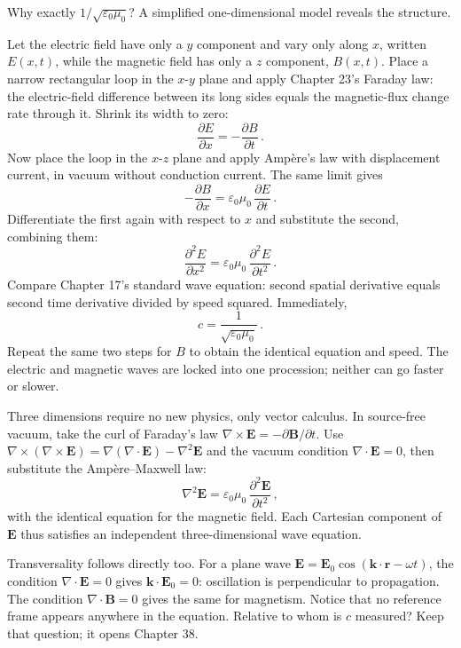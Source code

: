 \begin{mathbridge}
Why exactly $1/\sqrt{\varepsilon_0\mu_0}$? A simplified one-dimensional model reveals the structure.

Let the electric field have only a $y$ component and vary only along $x$, written $E(x,t)$, while the magnetic field has only a $z$ component, $B(x,t)$. Place a narrow rectangular loop in the $x$-$y$ plane and apply Chapter 23's Faraday law: the electric-field difference between its long sides equals the magnetic-flux change rate through it. Shrink its width to zero:
\[
  \frac{\partial E}{\partial x}=-\frac{\partial B}{\partial t}\,.
\]
Now place the loop in the $x$-$z$ plane and apply Ampère's law with displacement current, in vacuum without conduction current. The same limit gives
\[
  -\frac{\partial B}{\partial x}=\varepsilon_0\mu_0\,\frac{\partial E}{\partial t}\,.
\]
Differentiate the first again with respect to $x$ and substitute the second, combining them:
\[
  \frac{\partial^2 E}{\partial x^2}=\varepsilon_0\mu_0\,\frac{\partial^2 E}{\partial t^2}\,.
\]
Compare Chapter 17's standard wave equation: second spatial derivative equals second time derivative divided by speed squared. Immediately,
\[
  c=\frac{1}{\sqrt{\varepsilon_0\mu_0}}\,.
\]
Repeat the same two steps for $B$ to obtain the identical equation and speed. The electric and magnetic waves are locked into one procession; neither can go faster or slower.
\end{mathbridge}

\begin{challenge}
Three dimensions require no new physics, only vector calculus. In source-free vacuum, take the curl of Faraday's law $\nabla\times\bm E=-\partial\bm B/\partial t$. Use $\nabla\times(\nabla\times\bm E)=\nabla(\nabla\cdot\bm E)-\nabla^2\bm E$ and the vacuum condition $\nabla\cdot\bm E=0$, then substitute the Ampère--Maxwell law:
\[
  \nabla^2\bm E=\varepsilon_0\mu_0\,\frac{\partial^2\bm E}{\partial t^2}\,,
\]
with the identical equation for the magnetic field. Each Cartesian component of $\bm E$ thus satisfies an independent three-dimensional wave equation.

Transversality follows directly too. For a plane wave $\bm E=\bm E_0\cos(\bm k\cdot\bm r-\omega t)$, the condition $\nabla\cdot\bm E=0$ gives $\bm k\cdot\bm E_0=0$: oscillation is perpendicular to propagation. The condition $\nabla\cdot\bm B=0$ gives the same for magnetism. Notice that no reference frame appears anywhere in the equation. Relative to whom is $c$ measured? Keep that question; it opens Chapter 38.
\end{challenge}

